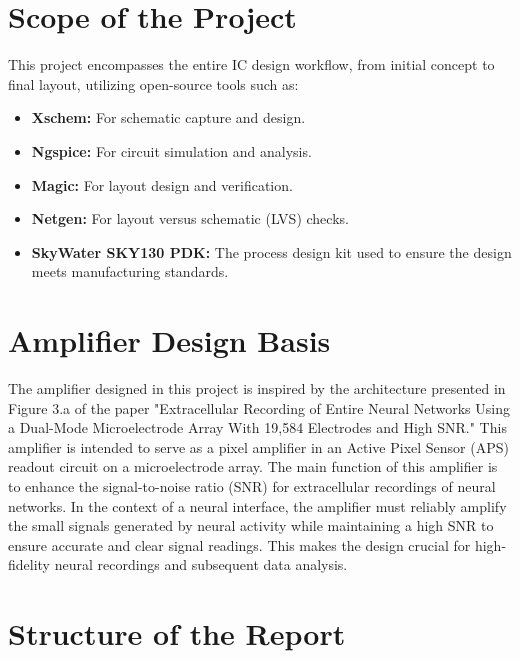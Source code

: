 \section{Scope of the Project}

This project encompasses the entire IC design workflow, from initial concept to final layout, utilizing open-source tools such as:
\begin{itemize}
    \item \textbf{Xschem:} For schematic capture and design.
    \item \textbf{Ngspice:} For circuit simulation and analysis.
    \item \textbf{Magic:} For layout design and verification.
    \item \textbf{Netgen:} For layout versus schematic (LVS) checks.
    \item \textbf{SkyWater SKY130 PDK:} The process design kit used to ensure the design meets manufacturing standards.
\end{itemize}

\section{Amplifier Design Basis}

The amplifier designed in this project is inspired by the architecture presented in Figure 3.a of the paper "Extracellular Recording of Entire Neural Networks Using a Dual-Mode Microelectrode Array With 19,584 Electrodes and High SNR." This amplifier is intended to serve as a pixel amplifier in an Active Pixel Sensor (APS) readout circuit on a microelectrode array. The main function of this amplifier is to enhance the signal-to-noise ratio (SNR) for extracellular recordings of neural networks. In the context of a neural interface, the amplifier must reliably amplify the small signals generated by neural activity while maintaining a high SNR to ensure accurate and clear signal readings. This makes the design crucial for high-fidelity neural recordings and subsequent data analysis.

\section{Structure of the Report}

